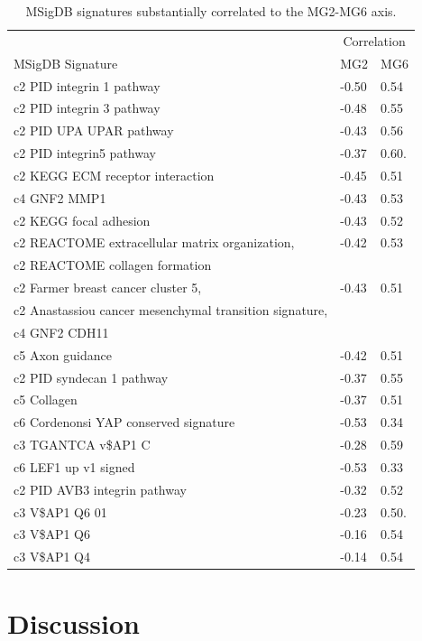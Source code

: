 \documentclass[dissertation.tex]{subfiles}
\begin{document}
\begin{table}[ht]
\caption{\acrshort{MSigDB} signatures substantially correlated to the MG2-MG6 axis.\label{tab:sigs-msigdb-corrs-mg26}}
\centering
\begin{tabularx}{\textwidth}{ @{} X l l @{} }
  \toprule
   & \multicolumn{2}{c}{Correlation} \\
  MSigDB Signature & MG2 & MG6 \\ 
  \midrule
  c2 PID integrin 1 pathway & -0.50 & 0.54 \\ 
  c2 PID integrin 3 pathway & -0.48 & 0.55 \\ 
  c2 PID UPA UPAR pathway & -0.43 & 0.56 \\ 
  c2 PID integrin5 pathway & -0.37 & 0.60.\\ 
  c2 KEGG ECM receptor interaction & -0.45 & 0.51 \\ 
  c4 GNF2 MMP1 & -0.43 & 0.53 \\ 
  c2 KEGG focal adhesion & -0.43 & 0.52 \\ 
  c2 REACTOME extracellular matrix organization, & -0.42 & 0.53 \\ 
  c2 REACTOME collagen formation & & \\
  c2 Farmer breast cancer cluster 5, & -0.43 & 0.51 \\ 
  c2 Anastassiou cancer mesenchymal transition signature, & & \\
  c4 GNF2 CDH11 & & \\
  c5 Axon guidance & -0.42 & 0.51 \\ 
  c2 PID syndecan 1 pathway & -0.37 & 0.55 \\ 
  c5 Collagen & -0.37 & 0.51 \\ 
  c6 Cordenonsi YAP conserved signature & -0.53 & 0.34 \\ 
  c3 TGANTCA v\$AP1 C & -0.28 & 0.59 \\ 
  c6 LEF1 up v1 signed & -0.53 & 0.33 \\ 
  c2 PID AVB3 integrin pathway & -0.32 & 0.52 \\ 
  c3 V\$AP1 Q6 01 & -0.23 & 0.50.\\ 
  c3 V\$AP1 Q6 & -0.16 & 0.54 \\ 
  c3 V\$AP1 Q4 & -0.14 & 0.54 \\ 
   \bottomrule
\end{tabularx}
\end{table}


\section{Discussion}
\end{document}
